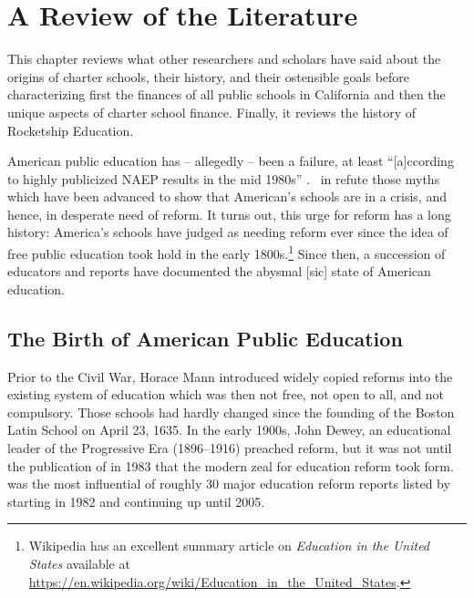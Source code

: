 
\chapter{A Review of the Literature}\label{ch:litreview}\indent%
This chapter reviews what other researchers and scholars have said about the origins of charter schools, their history, and their ostensible goals before characterizing first the finances of all public schools in California and then the unique aspects of charter school finance. Finally, it reviews the history of Rocketship Education.

American public education has – allegedly – been a failure, at least ``[a]ccording to highly publicized NAEP results in the mid 1980s'' \parencite{Gove.Meier2000}. \textcite{Berliner.Glass2014} in  refute those myths which have been advanced to show that American's schools are in a crisis, and hence, in desperate need of reform. It turns out, this urge for reform has a long history: America's schools have judged as needing reform ever since the idea of free public education took hold in the early 1800s.\footnote{Wikipedia has an excellent summary article on \textit{Education in the United States} available at \url{https://en.wikipedia.org/wiki/Education_in_the_United_States}.} Since then, a succession of educators and reports have documented the abysmal [sic] state of American education.

\section{The Birth of American Public Education}\label{sec:birth-amer-publ}\indent%

Prior to the Civil War, Horace Mann introduced widely copied reforms \parencite%
{Pulliam.VanPatten2007} into the existing system of education which was then not free, not open to all, and not compulsory. Those schools had hardly changed since the founding of the Boston Latin School on April 23, 1635. In the early 1900s, John Dewey, an educational leader of the Progressive Era (1896–1916) preached reform, but it was not until the publication of  in 1983 that the modern zeal for education reform took form.  was the most influential of roughly 30  major education reform reports listed by \textcite%
{Pulliam.VanPatten2007} starting in 1982 and continuing up until 2005.

